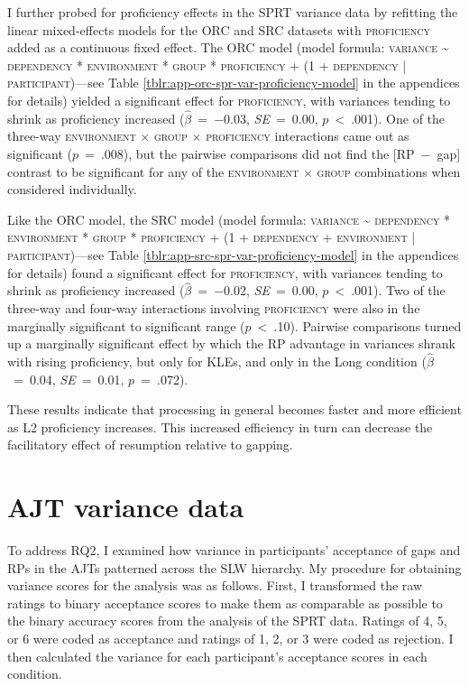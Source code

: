 I further probed for proficiency effects in the SPRT variance data by refitting the linear mixed-effects models for the ORC and SRC datasets with \textsc{proficiency} added as a continuous fixed effect. The ORC model (model formula: \textsc{variance \~{} dependency * environment * group * proficiency + (1 + dependency | participant)}---see Table \ref{tblr:app-orc-spr-var-proficiency-model} in the appendices for details) yielded a significant effect for \textsc{proficiency}, with variances tending to shrink as proficiency increased ($\hat{\beta}$~=~−0.03, \textit{SE}~=~0.00, $p$~<~.001). One of the three-way \textsc{environment} × \textsc{group} × \textsc{proficiency} interactions came out as significant ($p$~=~.008), but the pairwise comparisons did not find the [RP~−~gap] contrast to be significant for any of the \textsc{environment} × \textsc{group} combinations when considered individually. 

Like the ORC model, the SRC model (model formula: \textsc{variance \~{} dependency * environment * group * proficiency + (1 + dependency + environment | participant)}---see Table \ref{tblr:app-src-spr-var-proficiency-model} in the appendices for details) found a significant effect for \textsc{proficiency}, with variances tending to shrink as proficiency increased ($\hat{\beta}$~=~−0.02, \textit{SE}~=~0.00, $p$~<~.001). Two of the three-way and four-way interactions involving \textsc{proficiency} were also in the marginally significant to significant range ($p$~<~.10). Pairwise comparisons turned up a marginally significant effect by which the RP advantage in variances shrank with rising proficiency, but only for KLEs, and only in the Long condition ($\hat{\beta}$~=~0.04, \textit{SE}~=~0.01, $p$~=~.072). 

These results indicate that processing in general becomes faster and more efficient as L2 proficiency increases. This increased efficiency in turn can decrease the facilitatory effect of resumption relative to gapping.

\section{AJT variance data}\label{var-ajt}

To address RQ2, I examined how variance in participants' acceptance of gaps and RPs in the AJTs patterned across the SLW hierarchy. My procedure for obtaining variance scores for the analysis was as follows. First, I transformed the raw ratings to binary acceptance scores to make them as comparable as possible to the binary accuracy scores from the analysis of the SPRT data. Ratings of 4, 5, or 6 were coded as acceptance and ratings of 1, 2, or 3 were coded as rejection. I then calculated the variance for each participant's acceptance scores in each condition. 

